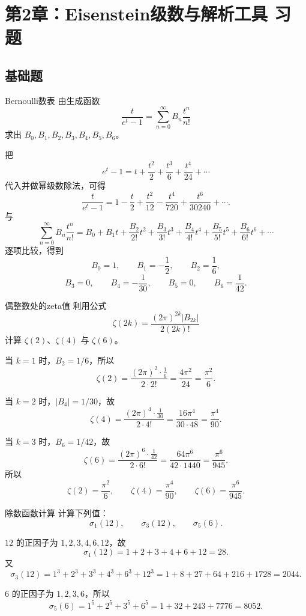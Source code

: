 \chapter{第2章：Eisenstein级数与解析工具 习题}
\difficultykey

\section{基础题 \easy}

\begin{problem}{Bernoulli数表}
\easy
由生成函数
\[
\frac{t}{e^t-1}=\sum_{n=0}^{\infty} B_n\frac{t^n}{n!}
\]
求出 $B_0,B_1,B_2,B_3,B_4,B_5,B_6$。
\end{problem}
\begin{solution}
把
\[
e^t-1=t+\frac{t^2}{2}+\frac{t^3}{6}+\frac{t^4}{24}+\cdots
\]
代入并做幂级数除法，可得
\[
\frac{t}{e^t-1}=1-\frac{t}{2}+\frac{t^2}{12}-\frac{t^4}{720}+\frac{t^6}{30240}+\cdots.
\]
与
\[
\sum_{n=0}^{\infty} B_n\frac{t^n}{n!}
= B_0+B_1 t+\frac{B_2}{2!}t^2+\frac{B_3}{3!}t^3+\frac{B_4}{4!}t^4+\frac{B_5}{5!}t^5+\frac{B_6}{6!}t^6+\cdots
\]
逐项比较，得到
\[
B_0=1,\qquad B_1=-\frac12,\qquad B_2=\frac16,
\]
\[
B_3=0,\qquad B_4=-\frac1{30},\qquad B_5=0,\qquad B_6=\frac1{42}.
\]
\end{solution}

\begin{problem}{偶整数处的zeta值}
\easy
利用公式
\[
\zeta(2k)=\frac{(2\pi)^{2k}|B_{2k}|}{2(2k)!}
\]
计算 $\zeta(2)$、$\zeta(4)$ 与 $\zeta(6)$。
\end{problem}
\begin{solution}
当 $k=1$ 时，$B_2=1/6$，所以
\[
\zeta(2)=\frac{(2\pi)^2\cdot \frac16}{2\cdot 2!}
=\frac{4\pi^2}{24}=\frac{\pi^2}{6}.
\]

当 $k=2$ 时，$|B_4|=1/30$，故
\[
\zeta(4)=\frac{(2\pi)^4\cdot \frac1{30}}{2\cdot 4!}
=\frac{16\pi^4}{30\cdot 48}=\frac{\pi^4}{90}.
\]

当 $k=3$ 时，$B_6=1/42$，故
\[
\zeta(6)=\frac{(2\pi)^6\cdot \frac1{42}}{2\cdot 6!}
=\frac{64\pi^6}{42\cdot 1440}=\frac{\pi^6}{945}.
\]
所以
\[
\zeta(2)=\frac{\pi^2}{6},\qquad
\zeta(4)=\frac{\pi^4}{90},\qquad
\zeta(6)=\frac{\pi^6}{945}.
\]
\end{solution}

\begin{problem}{除数函数计算}
\easy
计算下列值：
\[
\sigma_1(12),\qquad \sigma_3(12),\qquad \sigma_5(6).
\]
\end{problem}
\begin{solution}
$12$ 的正因子为 $1,2,3,4,6,12$，故
\[
\sigma_1(12)=1+2+3+4+6+12=28.
\]
又
\[
\sigma_3(12)=1^3+2^3+3^3+4^3+6^3+12^3
=1+8+27+64+216+1728=2044.
\]

$6$ 的正因子为 $1,2,3,6$，所以
\[
\sigma_5(6)=1^5+2^5+3^5+6^5=1+32+243+7776=8052.
\]
\end{solution}

